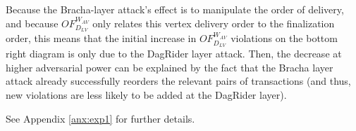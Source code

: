 Because the Bracha-layer attack's effect is to manipulate the order of delivery, and because $OF_{D_{LV}}^{W_{AV}}$ only relates this vertex delivery order to the finalization order, this means that the initial increase in $OF_{D_{LV}}^{W_{AV}}$ violations on the bottom right diagram is only due to the DagRider layer attack. Then, the decrease at higher adversarial power can be explained by the fact that the Bracha layer attack already successfully reorders the relevant pairs of transactions (and thus, new violations are less likely to be added at the DagRider layer).

See Appendix \ref{anx:exp1} for further details.





